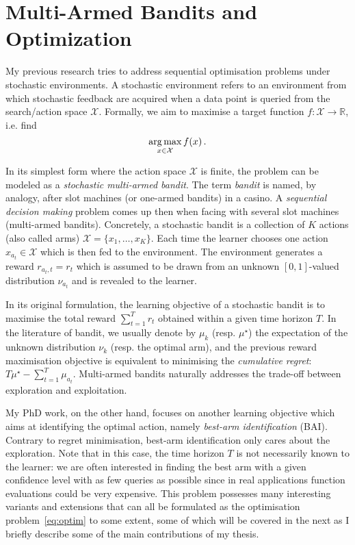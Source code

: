 \section{Multi-Armed Bandits and Optimization}\label{sec:intro.mab}
    
My previous research tries to address sequential optimisation problems under stochastic environments. A stochastic environment refers to an environment from which stochastic feedback are acquired when a data point is queried from the search/action space $\mathcal{X}$. Formally, we aim to maximise a target function $f:\mathcal{X}\rightarrow\mathbb{R}$, i.e. find 
\begin{equation}\label{eq:optim}
    \operatorname*{arg\,max}_{x\in\mathcal{X}} f(x)\,.
\end{equation}

In its simplest form where the action space $\mathcal{X}$ is finite, the problem can be modeled as a \emph{stochastic multi-armed bandit}. The term \emph{bandit} is named, by analogy, after slot machines (or one-armed bandits) in a casino. A \emph{sequential decision making} problem comes up then when facing with several slot machines (multi-armed bandits). Concretely, a stochastic bandit is a collection of $K$ actions (also called arms) $\mathcal{X} = \{x_1,\ldots,x_K\}$. Each time the learner chooses one action $x_{a_t}\in\mathcal{X}$ which is then fed to the environment. The environment generates a reward $r_{a_t,t}=r_t$ which is assumed to be drawn from an unknown $[0,1]$-valued distribution $\nu_{a_t}$ and is revealed to the learner.

In its original formulation, the learning objective of a stochastic bandit is to maximise the total reward $\sum_{t=1}^T r_t$ obtained within a given time horizon $T$. In the literature of bandit, we usually denote by $\mu_k$ (resp. $\mu^\star$) the expectation of the unknown distribution $\nu_k$ (resp. the optimal arm), and the previous reward maximisation objective is equivalent to minimising the \emph{cumulative regret}: $T\mu^\star-\sum_{t=1}^T \mu_{a_t}$. %
Multi-armed bandits naturally addresses the trade-off between exploration and exploitation.

My PhD work, on the other hand, focuses on another learning objective which aims at identifying the optimal action, namely \emph{best-arm identification} (BAI). Contrary to regret minimisation, best-arm identification only cares about the exploration. Note that in this case, the time horizon $T$ is not necessarily known to the learner: we are often interested in finding the best arm with a given confidence level with as few queries as possible since in real applications function evaluations could be very expensive. This problem possesses many interesting variants and extensions that can all be formulated as the optimisation problem~\eqref{eq:optim} to some extent, some of which will be covered in the next as I briefly describe some of the main contributions of my thesis.
    
